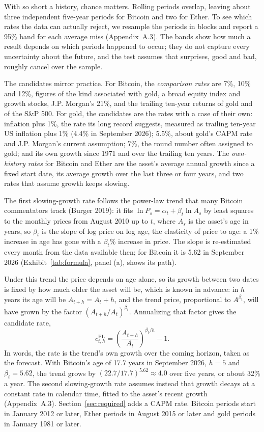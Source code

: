 \documentclass[12pt]{article}
\theoremstyle{plain}
\theoremstyle{remark}
\begin{document}
With so short a history, chance matters. Rolling periods overlap, leaving about three independent five-year periods for Bitcoin and two for Ether. To see which rates the data can actually reject, we resample the periods in blocks and report a 95\% band for each average miss (Appendix~A.3). The bands show how much a result depends on which periods happened to occur; they do not capture every uncertainty about the future, and the test assumes that surprises, good and bad, roughly cancel over the sample.

The candidates mirror practice. For Bitcoin, the \emph{comparison rates} are 7\%, 10\% and 12\%, figures of the kind associated with gold, a broad equity index and growth stocks, J.P. Morgan's 21\%, and the trailing ten-year returns of gold and of the S\&P 500. For gold, the candidates are the rates with a case of their own: inflation plus 1\%, the rate its long record suggests, measured as trailing ten-year US inflation plus 1\% (4.4\% in September 2026); 5.5\%, about gold's CAPM rate and J.P. Morgan's current assumption; 7\%, the round number often assigned to gold; and its own growth since 1971 and over the trailing ten years. The \emph{own-history rates} for Bitcoin and Ether are the asset's average annual growth since a fixed start date, its average growth over the last three or four years, and two rates that assume growth keeps slowing.

The first slowing-growth rate follows the power-law trend that many Bitcoin commentators track (Burger 2019): it fits $\ln P_s=\alpha_t+\beta_t\ln A_s$ by least squares to the monthly prices from August 2010 up to $t$, where $A_s$ is the asset's age in years, so $\beta_t$ is the slope of log price on log age, the elasticity of price to age: a 1\% increase in age has gone with a $\beta_t$\% increase in price. The slope is re-estimated every month from the data available then; for Bitcoin it is 5.62 in September 2026 (Exhibit~\ref{tab:formula}, panel (a), shows its path).

Under this trend the price depends on age alone, so its growth between two dates is fixed by how much older the asset will be, which is known in advance: in $h$ years its age will be $A_{t+h}=A_t+h$, and the trend price, proportional to $A^{\beta_t}$, will have grown by the factor $(A_{t+h}/A_t)^{\beta_t}$. Annualizing that factor gives the candidate rate,
\begin{equation}
c^{\mathrm{PL}}_{t,h}=\left(\frac{A_{t+h}}{A_t}\right)^{\beta_t/h}-1. \label{eq:powerlaw}
\end{equation}
In words, the rate is the trend's own growth over the coming horizon, taken as the forecast. With Bitcoin's age of 17.7 years in September 2026, $h=5$ and $\beta_t=5.62$, the trend grows by $(22.7/17.7)^{5.62}\approx4.0$ over five years, or about 32\% a year. The second slowing-growth rate assumes instead that growth decays at a constant rate in calendar time, fitted to the asset's recent growth (Appendix~A.3). Section~\ref{sec:required} adds a CAPM rate. Bitcoin periods start in January 2012 or later, Ether periods in August 2015 or later and gold periods in January 1981 or later.
\end{document}
